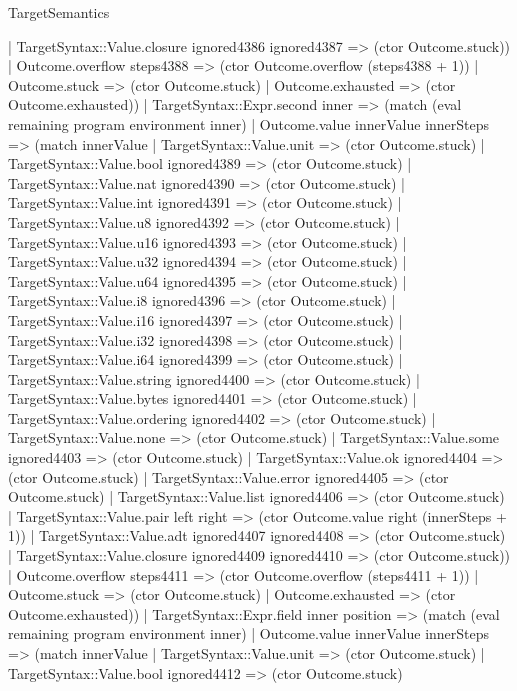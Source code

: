 \begin{lexlean}{TargetSemantics}
\begin{semanticmodule}
{          | TargetSyntax::Value.closure ignored4386 ignored4387 => (ctor Outcome.stuck))
        | Outcome.overflow steps4388 => (ctor Outcome.overflow (steps4388 + 1))
        | Outcome.stuck => (ctor Outcome.stuck)
        | Outcome.exhausted => (ctor Outcome.exhausted))
      | TargetSyntax::Expr.second inner => (match (eval remaining program environment inner)
        | Outcome.value innerValue innerSteps => (match innerValue
          | TargetSyntax::Value.unit => (ctor Outcome.stuck)
          | TargetSyntax::Value.bool ignored4389 => (ctor Outcome.stuck)
          | TargetSyntax::Value.nat ignored4390 => (ctor Outcome.stuck)
          | TargetSyntax::Value.int ignored4391 => (ctor Outcome.stuck)
          | TargetSyntax::Value.u8 ignored4392 => (ctor Outcome.stuck)
          | TargetSyntax::Value.u16 ignored4393 => (ctor Outcome.stuck)
          | TargetSyntax::Value.u32 ignored4394 => (ctor Outcome.stuck)
          | TargetSyntax::Value.u64 ignored4395 => (ctor Outcome.stuck)
          | TargetSyntax::Value.i8 ignored4396 => (ctor Outcome.stuck)
          | TargetSyntax::Value.i16 ignored4397 => (ctor Outcome.stuck)
          | TargetSyntax::Value.i32 ignored4398 => (ctor Outcome.stuck)
          | TargetSyntax::Value.i64 ignored4399 => (ctor Outcome.stuck)
          | TargetSyntax::Value.string ignored4400 => (ctor Outcome.stuck)
          | TargetSyntax::Value.bytes ignored4401 => (ctor Outcome.stuck)
          | TargetSyntax::Value.ordering ignored4402 => (ctor Outcome.stuck)
          | TargetSyntax::Value.none => (ctor Outcome.stuck)
          | TargetSyntax::Value.some ignored4403 => (ctor Outcome.stuck)
          | TargetSyntax::Value.ok ignored4404 => (ctor Outcome.stuck)
          | TargetSyntax::Value.error ignored4405 => (ctor Outcome.stuck)
          | TargetSyntax::Value.list ignored4406 => (ctor Outcome.stuck)
          | TargetSyntax::Value.pair left right => (ctor Outcome.value right (innerSteps + 1))
          | TargetSyntax::Value.adt ignored4407 ignored4408 => (ctor Outcome.stuck)
          | TargetSyntax::Value.closure ignored4409 ignored4410 => (ctor Outcome.stuck))
        | Outcome.overflow steps4411 => (ctor Outcome.overflow (steps4411 + 1))
        | Outcome.stuck => (ctor Outcome.stuck)
        | Outcome.exhausted => (ctor Outcome.exhausted))
      | TargetSyntax::Expr.field inner position => (match (eval remaining program environment inner)
        | Outcome.value innerValue innerSteps => (match innerValue
          | TargetSyntax::Value.unit => (ctor Outcome.stuck)
          | TargetSyntax::Value.bool ignored4412 => (ctor Outcome.stuck)
}
\end{semanticmodule}
\end{lexlean}

